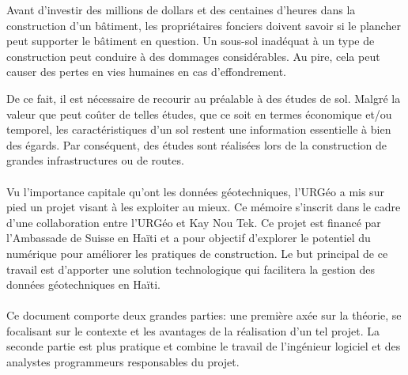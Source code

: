 
    \par
    Avant d’investir des millions de dollars et des centaines d’heures dans la 
    construction d'un bâtiment, les propriétaires fonciers doivent savoir si le 
    plancher peut supporter le bâtiment en question.
    Un sous-sol inadéquat à un type de construction peut conduire à des 
    dommages considérables. Au pire, cela peut causer des pertes en vies humaines 
    en cas d'effondrement.
    \par
    De ce fait, il est nécessaire de recourir au préalable à des études de sol.   
    Malgré la valeur que peut coûter de telles études, que ce soit en termes
    économique et/ou temporel, les caractéristiques d’un sol restent une
    information essentielle à bien des égards. Par conséquent, des études sont 
    réalisées lors de la construction de grandes infrastructures ou de routes. 
    
    \paragraph{}
    Vu l'importance capitale qu'ont les données géotechniques, l'URGéo a
    mis sur pied un projet visant à les exploiter au mieux.
    Ce mémoire s'inscrit dans le cadre d'une collaboration entre
    l'URGéo et Kay Nou Tek. Ce projet est financé par l’Ambassade
    de Suisse en Haïti et a pour objectif d’explorer le potentiel 
    du numérique pour améliorer les pratiques de construction.
    Le but principal de ce travail est
    d'apporter une solution technologique  qui facilitera la 
    gestion des données géotechniques en Haïti.
    \paragraph{}
    Ce document comporte deux grandes parties: une première axée
    sur la théorie, se focalisant sur le contexte et les avantages
    de la réalisation d'un tel projet. La seconde partie est plus pratique
    et combine le travail de l'ingénieur logiciel et des analystes programmeurs responsables
    du projet.
